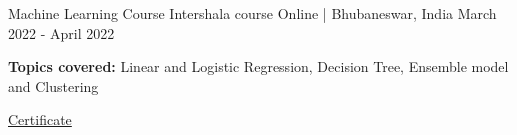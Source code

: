 \begin{cventries}
	\cventry
	{Machine Learning Course} %
	{Intershala course} %
	{Online | Bhubaneswar, India} %
	{March 2022 - April 2022} %
	{
		\begin{cvitems} %
			\item \textbf{Topics covered: } Linear and Logistic Regression, Decision Tree, Ensemble model and Clustering
			\item \href{https://trainings.internshala.com/s/v/883630/29b11593}{Certificate}
		\end{cvitems}
	}

	

	

\end{cventries}
